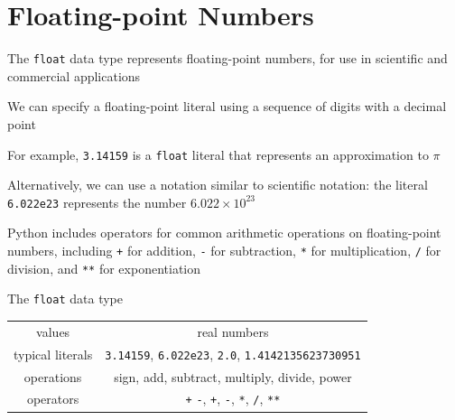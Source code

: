 \documentclass[8pt,a4paper,compress]{beamer}
\begin{document}
\section{Floating-point Numbers}
\begin{frame}[fragile]
\pause

The \lstinline{float} data type represents floating-point numbers, for use in scientific and commercial applications

\pause
\bigskip

We can specify a floating-point literal using a sequence of digits with a decimal point

\pause
\bigskip

For example, \lstinline{3.14159} is a \lstinline{float} literal that represents an approximation to $\pi$

\pause
\bigskip

Alternatively, we can use a notation similar to scientific notation: the literal \lstinline{6.022e23} represents the number $6.022 \times 10^{23}$

\pause
\bigskip

Python includes operators for common arithmetic operations on floating-point numbers, including \lstinline{+} for addition, \lstinline{-} for subtraction, \lstinline{*} for multiplication, \lstinline{/} for division, and \lstinline{**} for exponentiation

\pause
\bigskip

The \lstinline{float} data type
\begin{center}
\begin{tabular}{c|c}
values & real numbers \\
typical literals & \lstinline$3.14159$, \lstinline$6.022e23$, \lstinline$2.0$, \lstinline$1.4142135623730951$ \\ 
operations & sign, add, subtract, multiply, divide, power \\
operators & \lstinline$+$ \lstinline$-$, \lstinline$+$, \lstinline$-$, \lstinline$*$, \lstinline$/$, \lstinline$**$
\end{tabular} 
\end{center}
\end{frame}
\end{document}
